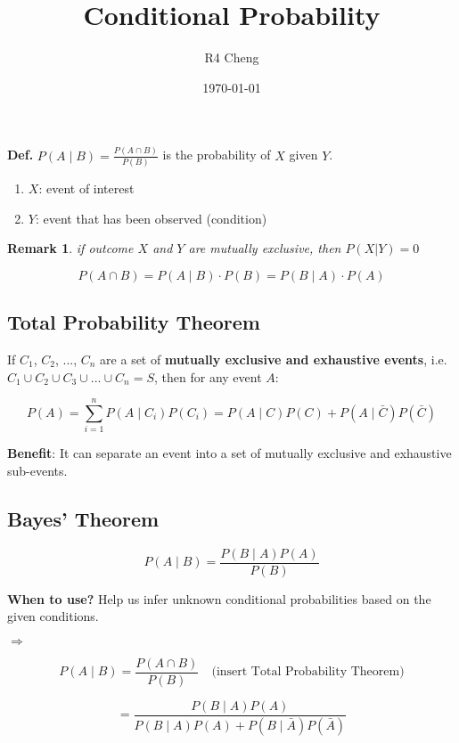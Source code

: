 \documentclass[12pt,a4paper]{article}
\title{Conditional Probability}
\author{R4 Cheng}
\date{\today}
\newtheorem*{rem}{Remark}
\newcommand{\Remark}[1]{
  \begin{rem}
    \color{cyan}
    #1
  \end{rem}
}
\begin{document}
\maketitle

\textbf{Def.} $P(A \mid B) = \frac{P(A \cap B)}{P(B)}$ is the probability of $X$ given $Y$.

\begin{enumerate}
    \item $X$: event of interest
    \item $Y$: event that has been observed (condition)
\end{enumerate}

\Remark{if outcome $X$ and $Y$ are mutually exclusive, then $P(X|Y) = 0$}

\[ P(A \cap B) = P(A \mid B) \cdot P(B) = P(B \mid A) \cdot P(A) \]

\subsection*{Total Probability Theorem}

If $C_1$, $C_2$, ..., $C_n$ are a set of \textbf{mutually exclusive and exhaustive events}, i.e. $C_1 \cup C_2 \cup C_3 \cup ... \cup C_n = S$, then for any event $A$:

\[ P(A) = \sum_{i=1}^{n} P(A \mid C_i) P(C_i) =  P(A \mid C) P(C) + P(A \mid \bar{C}) P(\bar{C}) \]

\textbf{Benefit}: It can separate an event into a set of mutually exclusive and exhaustive sub-events.

\subsection*{Bayes' Theorem}

\[ P(A \mid B) = \frac{P(B \mid A) P(A)}{P(B)} \]


\textbf{When to use?} Help us infer unknown conditional probabilities based on the given conditions.

$\Rightarrow$

\[P(A \mid B) = \frac{P(A \cap B)}{P(B)} \quad \text{(insert Total Probability Theorem)}\]

\[ = \frac{P(B \mid A)P(A)}{P(B \mid A)P(A) + P(B \mid \bar{A})P(\bar{A})}\]
\end{document}
